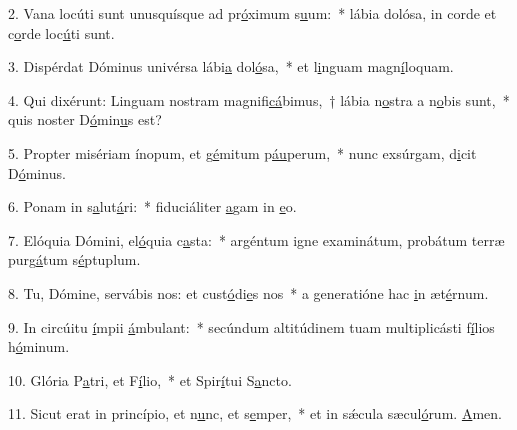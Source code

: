 2. Vana locúti sunt unusquísque ad pr\uline{ó}ximum s\uline{u}um:~* lábia dolósa, in corde et c\uline{o}rde loc\uline{ú}ti sunt.\par 
3. Dispérdat Dóminus univérsa lábi\uline{a} dol\uline{ó}sa,~* et l\uline{i}nguam magn\uline{í}loquam.\par 
4. Qui dixérunt: Linguam nostram magnifi\uline{cá}bimus,~† lábia n\uline{o}stra a n\uline{o}bis sunt,~* quis noster D\uline{ó}min\uline{u}s est?\par 
5. Propter misériam ínopum, et g\uline{é}mitum p\uline{áu}perum,~* nunc exsúrgam, d\uline{i}cit D\uline{ó}minus.\par 
6. Ponam in s\uline{a}lut\uline{á}ri:~* fiduciáliter \uline{a}gam in \uline{e}o.\par 
7. Elóquia Dómini, el\uline{ó}quia c\uline{a}sta:~* argéntum igne examinátum, probátum terræ purg\uline{á}tum s\uline{é}ptuplum.\par 
8. Tu, Dómine, servábis nos: et cust\uline{ó}di\uline{e}s nos~* a generatióne hac \uline{i}n æt\uline{é}rnum.\par 
9. In circúitu \uline{í}mpii \uline{á}mbulant:~* secúndum altitúdinem tuam multiplicásti f\uline{í}lios h\uline{ó}minum.\par 
10. Glória P\uline{a}tri, et F\uline{í}lio,~* et Spir\uline{í}tui S\uline{a}ncto.\par 
11. Sicut erat in princípio, et n\uline{u}nc, et s\uline{e}mper,~* et in sǽcula sæcul\uline{ó}rum. \uline{A}men.\par 
